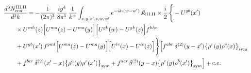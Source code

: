 \begingroup\small
\begin{align}\label{eq:H-III.II-2}
&\frac{d^{3}N^{\rm III.II}_{{\rm con}}}{d^{3}k}=-\frac{1}{(2\pi)^{3}}\, \frac{ig^{4}}{8\pi^{5}}\, \frac{1}{k^{+}} \int_{x,y,x',z,w,w'}e^{-ik\cdot(w-w')}\, \mathfrak{K}_{\rm III.II} \times \frac{i}{2}\, \Bigg\{-U^{gb}(x')\notag\\
&\quad\quad \times U^{mh}(z)\Big[U^{ma}(z)-U^{ma}(y)\Big]\Big[U^{gk}(w)-U^{gk}(z)\Big]f^{khc}\notag\\
&\quad\quad +U^{gb}(x')\, f^{gml}\Big[U^{ma}(z)-U^{ma}(y)\Big]\Big[U^{lc}(x)-U^{lc}(z)\Big]\Bigg\} \Big[f^{abr}\, \delta^{(2)}(y-x')\big\{\rho^{r}(y)\rho^{c}(x)\big\}_{\rm sym}\notag\\
&\quad\quad +f^{bcr}\, \delta^{(2)}(x'-x)\big\{\rho^{a}(y)\rho^{r}(x')\big\}_{\rm sym} +f^{acr}\, \delta^{(2)}(y-x)\big\{\rho^{r}(y)\rho^{b}(x')\big\}_{\rm sym}\Big] +{\rm c.c.}
\end{align}
\endgroup
